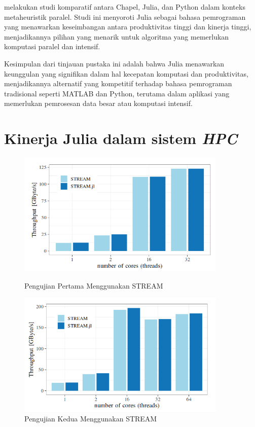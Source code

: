 \cite{gmysComparativeStudyHighproductivity2020} melakukan studi komparatif antara
Chapel, Julia, dan Python dalam konteks metaheuristik paralel. Studi ini
menyoroti Julia sebagai bahasa pemrograman yang menawarkan keseimbangan antara
produktivitas tinggi dan kinerja tinggi, menjadikannya pilihan yang menarik untuk
algoritma yang memerlukan komputasi paralel dan intensif.

Kesimpulan dari tinjauan pustaka ini adalah bahwa Julia menawarkan keunggulan
yang signifikan dalam hal kecepatan komputasi dan produktivitas, menjadikannya
alternatif yang kompetitif terhadap bahasa pemrograman tradisional seperti
MATLAB dan Python, terutama dalam aplikasi yang memerlukan pemrosesan data
besar atau komputasi intensif.


\section{Kinerja Julia dalam sistem \emph{HPC}}

\begin{figure}[H]
  \centering
  \includegraphics[width=10cm]{images/stream-1.png}
  \caption{Pengujian Pertama Menggunakan STREAM}
  \label{gambar stream-1}
  \includegraphics[width=10cm]{images/stream-2.png}
  \caption{Pengujian Kedua Menggunakan STREAM}
  \label{gambar stream-2}
\end{figure}

